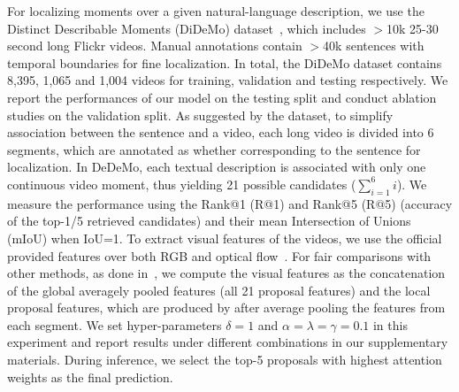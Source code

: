 For localizing moments over a given natural-language description,
we use the Distinct Describable Moments (DiDeMo) dataset~\citep{hendricks2018localizing}, 
which includes $>$10k 25-30 second long Flickr videos. 
Manual annotations contain  $>$40k sentences with temporal boundaries 
for fine localization. 
In total, the DiDeMo dataset contains 
8,395, 1,065 and 1,004 videos for training, validation and testing respectively. We report the performances of our model on the testing split and conduct ablation studies on the validation split.
As suggested by the dataset, 
to simplify association between the sentence and a video, 
each long video is divided into 6 segments, which are annotated as whether corresponding to the sentence for localization. 
In DeDeMo, each textual description is associated with only one continuous video moment, thus yielding 21 possible candidates ($\sum_{i=1}^{6}i$). 
We measure the performance using the Rank@1 (R@1) and Rank@5 (R@5) (accuracy of the top-1/5 retrieved candidates) and their mean Intersection of Unions (mIoU) when IoU=1. To extract visual features of the videos, 
we use the official provided features 
over both RGB and optical flow~\citep{anne2017localizing}. 
For fair comparisons with other methods, as done in~\citep{hendricks2018localizing,anne2017localizing}, we compute the visual features as the concatenation of the global averagely pooled features (all 21 proposal features) and the local proposal features, which are produced by after average pooling the features from each segment.
We set hyper-parameters $\delta=1$ and $\alpha=\lambda=\gamma=0.1$ in this experiment and report results under different combinations in our supplementary materials.
During inference, we select the top-5 proposals with highest attention weights as the final prediction.

